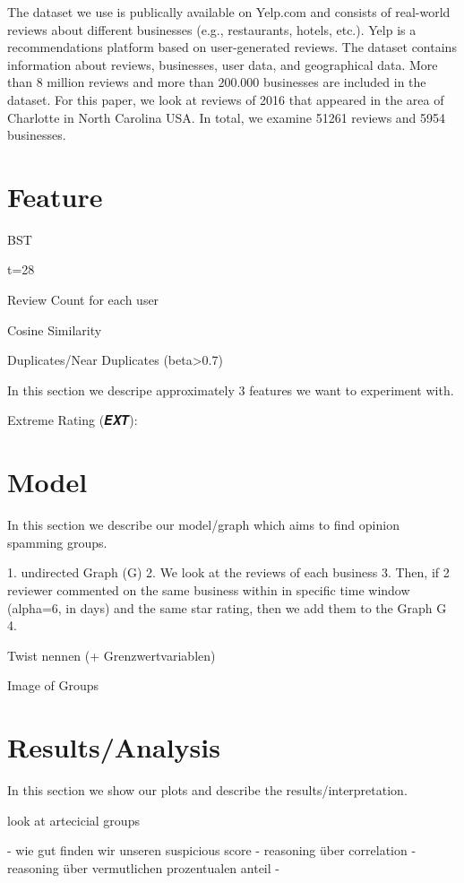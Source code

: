 \documentclass[conference]{IEEEtran}  %
\theoremstyle{plain}
\theoremstyle{definition}
\theoremstyle{remark}
\begin{document}
The dataset we use is publically available on Yelp.com and consists of real-world reviews about different businesses (e.g., restaurants, hotels, etc.). Yelp is a recommendations platform based on user-generated reviews. The dataset contains information about reviews, businesses, user data, and geographical data. More than 8 million reviews and more than 200.000 businesses are included in the dataset. For this paper, we look at reviews of 2016 that appeared in the area of Charlotte in North Carolina USA. In total, we examine 51261 reviews and 5954 businesses.  

\section{Feature}
\label{sec:feature}

BST

t=28

Review Count for each user

Cosine Similarity

Duplicates/Near Duplicates (beta>0.7)

In this section we descripe approximately 3 features we want to experiment with.  


Extreme Rating (𝑬𝑿𝑻):


 
\section{Model}
\label{sec:model}

In this section we describe our model/graph which aims to find opinion spamming groups.

1. undirected Graph (G)
2. We look at the reviews of each business
3. Then, if 2 reviewer commented on the same business within in specific time window (alpha=6, in days) and the same star rating, then we add them to the Graph G 
4. 

Twist nennen (+ Grenzwertvariablen) 

Image of Groups


\section{Results/Analysis}
\label{sec:analysis}

In this section we show our plots and describe the results/interpretation. 

look at artecicial groups

- wie gut finden wir unseren suspicious score
- reasoning über correlation
- reasoning über vermutlichen prozentualen anteil
  - 
\end{document}
